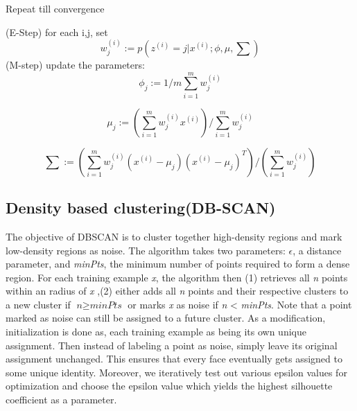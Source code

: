 \documentclass[a4paper,12pt, twoside]{NITKReport}
\begin{document}
Repeat till convergence

(E-Step) for each i,j, set
\begin{equation}
w_{j}^{(i)} := p(z^{(i)}=j|x^{(i)};\phi, \mu, \sum )
\end{equation}
\newline
(M-step) update the parameters:
\begin{equation}
\phi _{j} := 1/m\sum_{i=1}^{m} w_{j}^{(i)}
\end{equation}

\begin{equation}
\mu _{j} := (\sum_{i=1}^{m} w_{j}^{(i)}x^{(i)})/\sum_{i=1}^{m}w_{j}^{(i)}
\end{equation}

\begin{equation}
\sum :=( \sum_{i=1}^{m} w_{j}^{(i)}(x^{(i)}-\mu _{j})(x^{(i)}-\mu _{j})^{T}) / (\sum_{i=1}^{m} w_{j}^{(i)})
\end{equation}

\subsection{Density based clustering(DB-SCAN)}
\par The  objective  of  DBSCAN  is  to  cluster  together  high-density regions and mark low-density regions as noise. The algorithm takes two parameters: $\epsilon$,  a distance parameter, and \textit{minPts}, the minimum number of points required to
form a dense region. For each training example \textit{x}, the algorithm then (1) retrieves all \textit{n} points within an radius of \textit{x} ,(2) either adds all
\textit{n} points and their respective clusters to a new cluster if $\textit{n} \geq
\textit{minPts}$ or marks \textit{x} as noise if \textit{n} < \textit{minPts}. Note that a point marked as noise can still be assigned to a future cluster. As a modification, initialization is done as, each training example as being its own unique assignment. Then instead of labeling a point as noise, simply leave its original assignment unchanged. This ensures that every face eventually gets assigned to some unique identity.  Moreover, we iteratively test out various epsilon values for optimization and choose the epsilon value which yields the highest silhouette coefficient as a parameter.
\end{document}
